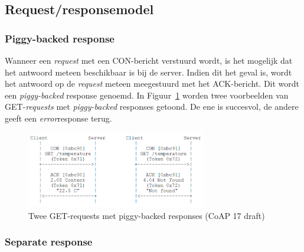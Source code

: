 \subsection{Request/responsemodel}

\subsubsection{Piggy-backed response}

Wanneer een \textit{request} met een CON-bericht verstuurd wordt, is het mogelijk dat het antwoord meteen beschikbaar is bij de server. Indien dit het geval is, wordt het antwoord op de \textit{request} meteen meegestuurd met het ACK-bericht. Dit wordt een \textit{piggy-backed} response genoemd. In Figuur~\ref{fig:CoAPPiggyBacked} worden twee voorbeelden van GET-\textit{requests} met \textit{piggy-backed} responses getoond. De ene is succesvol, de andere geeft een \textit{error}response terug.
\begin{figure}[h]
\vspace{10pt}
\centering
\includegraphics[width=0.7\textwidth]{fig/CoAPPiggyBacked}
\caption{Twee GET-requests met piggy-backed responses (CoAP 17 draft)}
\label{fig:CoAPPiggyBacked}
\vspace{-20pt}
\end{figure}

\newpage
\subsubsection{Separate response} \label{separate}

